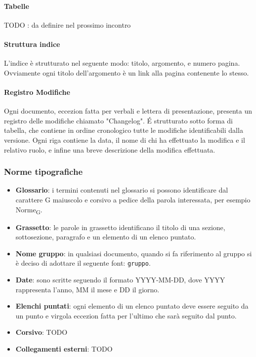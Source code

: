 \paragraph{Tabelle}
TODO : da definire nel prossimo incontro

\paragraph{Struttura indice}
L'indice è strutturato nel seguente modo: titolo, argomento, e numero pagina. Ovviamente ogni titolo dell'argomento è un link alla pagina contenente lo stesso.

\paragraph{Registro Modifiche}
Ogni documento, eccezion fatta per verbali e lettera di presentazione, presenta un registro delle modifiche chiamato "Changelog". \'E strutturato sotto forma di tabella, che contiene in ordine cronologico tutte le modifiche identificabili dalla versione.  Ogni riga contiene la data, il nome di chi ha effettuato la modifica e il relativo ruolo, e infine una breve descrizione della modifica effettuata.

\subsubsection{Norme tipografiche}

\begin{itemize}
	\item \textbf{Glossario}: i termini contenuti nel glossario si possono identificare dal carattere G maiuscolo e corsivo a pedice della parola interessata, per esempio Norme\textsubscript{G}.
	\item \textbf{Grassetto}: le parole in grassetto identificano il titolo di una sezione, sottosezione, paragrafo e un elemento di un elenco puntato.
	\item \textbf{Nome gruppo}: in qualsiasi documento, quando si fa riferimento al gruppo si è deciso di adottare il seguente font: \texttt{gruppo}.
	\item \textbf{Date}: sono scritte seguendo il formato YYYY-MM-DD, dove YYYY rappresenta l'anno, MM il mese e DD il giorno.
	\item \textbf{Elenchi puntati}: ogni elemento di un elenco puntato deve essere seguito da un punto e virgola eccezion fatta per l'ultimo che sarà seguito dal punto.
	\item \textbf{Corsivo}: TODO
	\item \textbf{Collegamenti esterni}: TODO
\end{itemize}


